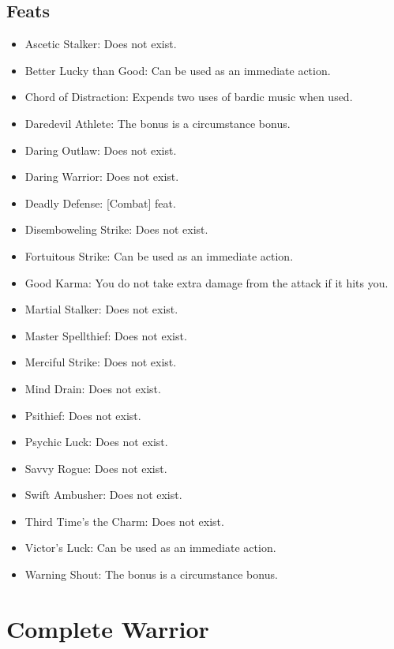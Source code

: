 \subsection{Feats}
\begin{itemize}
\item Ascetic Stalker: Does not exist. %
\item Better Lucky than Good: Can be used as an immediate action.
\item Chord of Distraction: Expends two uses of bardic music when used.
\item Daredevil Athlete: The bonus is a circumstance bonus.
\item Daring Outlaw: Does not exist. %
\item Daring Warrior: Does not exist. %
\item Deadly Defense: [Combat] feat.
\item Disemboweling Strike: Does not exist.
\item Fortuitous Strike: Can be used as an immediate action.
\item Good Karma: You do not take extra damage from the attack if it hits you.
\item Martial Stalker: Does not exist. %
\item Master Spellthief: Does not exist. %
\item Merciful Strike: Does not exist.
\item Mind Drain: Does not exist. %
\item Psithief: Does not exist. %
\item Psychic Luck: Does not exist. %
\item Savvy Rogue: Does not exist.
\item Swift Ambusher: Does not exist. %
\item Third Time's the Charm: Does not exist.
\item Victor's Luck: Can be used as an immediate action.
\item Warning Shout: The bonus is a circumstance bonus.
\end{itemize}

\section{Complete Warrior}

